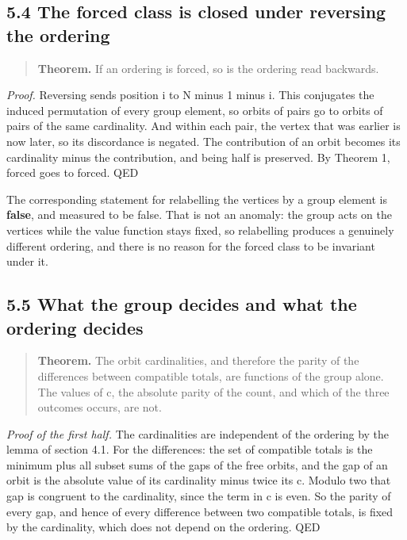 \documentclass[11pt,a4paper]{article}
\begin{document}
\subsection*{5.4 The forced class is closed under reversing the ordering}

\begin{quote}
\textbf{Theorem.} If an ordering is forced, so is the ordering read backwards.
\end{quote}

\emph{Proof.} Reversing sends position i to N minus 1 minus i. This conjugates the induced permutation of every group element, so orbits of pairs go to orbits of pairs of the same cardinality. And within each pair, the vertex that was earlier is now later, so its discordance is negated. The contribution of an orbit becomes its cardinality minus the contribution, and being half is preserved. By Theorem 1, forced goes to forced. QED

The corresponding statement for relabelling the vertices by a group element is \textbf{false}, and measured to be false. That is not an anomaly: the group acts on the vertices while the value function stays fixed, so relabelling produces a genuinely different ordering, and there is no reason for the forced class to be invariant under it.

\subsection*{5.5 What the group decides and what the ordering decides}

\begin{quote}
\textbf{Theorem.} The orbit cardinalities, and therefore the parity of the differences between compatible totals, are functions of the group alone. The values of c, the absolute parity of the count, and which of the three outcomes occurs, are not.
\end{quote}

\emph{Proof of the first half.} The cardinalities are independent of the ordering by the lemma of section 4.1. For the differences: the set of compatible totals is the minimum plus all subset sums of the gaps of the free orbits, and the gap of an orbit is the absolute value of its cardinality minus twice its c. Modulo two that gap is congruent to the cardinality, since the term in c is even. So the parity of every gap, and hence of every difference between two compatible totals, is fixed by the cardinality, which does not depend on the ordering. QED
\end{document}
